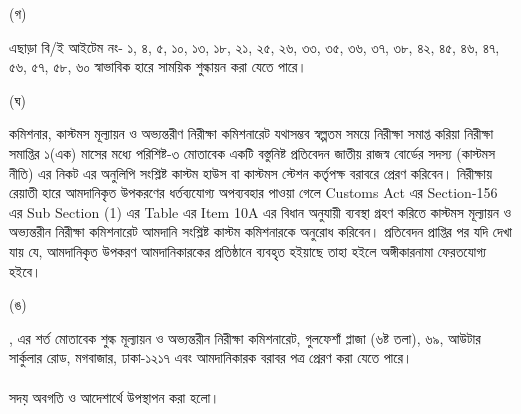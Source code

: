 \documentclass[12pt]{article}
\begin{document}
\begin{minipage}[t]{0.05\linewidth}
\hspace{1em}
\end{minipage}
\begin{minipage}[t]{0.05\linewidth}
(গ)
\end{minipage}
\begin{minipage}[t]{0.90\linewidth}
এছাড়া বি/ই আইটেম নং-
১, ৪, ৫, ‌১০, ১৩, ১৮,
২১, ২৫, ২৬, ৩৩, ৩৫, ৩৬, ৩৭, ৩৮,
৪২, ৪৫, ৪৬, ৪৭, ৫৬, ৫৭, ৫৮, ৬০
স্বাভাবিক হারে
সাময়িক
শুল্কায়ন করা
যেতে পারে।
\\
\end{minipage}
\begin{minipage}[t]{0.05\linewidth}
\hspace{1em}
\end{minipage}
\begin{minipage}[t]{0.05\linewidth}
(ঘ)
\end{minipage}
\begin{minipage}[t]{0.90\linewidth}
কমিশনার, কাস্টমস মূল্যায়ন ও অভ্যন্তরীণ
নিরীক্ষা কমিশনারেট যথাসম্ভব স্বল্পতম সময়ে
নিরীক্ষা সমাপ্ত করিয়া নিরীক্ষা সমাপ্তির
১(এক) মাসের মধ্যে পরিশিষ্ট-৩ মোতাবেক একটি
বস্তুনিষ্ট প্রতিবেদন জাতীয় রাজস্ব বোর্ডের
সদস্য (কাস্টমস নীতি) এর নিকট এর অনুলিপি সংশ্লিষ্ট
কাস্টম হাউস বা কাস্টমস স্টেশন কর্তৃপক্ষ
বরাবরে প্রেরণ করিবেন।
নিরীক্ষায় রেয়াতী হারে আমদানিকৃত উপকরণের
ধর্তব্যযোগ্য অপব্যবহার পাওয়া গেলে
Customs Act এর Section-156
এর Sub Section (1) এর Table এর Item 10A
এর বিধান অনুযায়ী ব্যবস্থা গ্রহণ করিতে কাস্টমস
মূল্যায়ন ও অভ্যন্তরীন নিরীক্ষা কমিশনারেট আমদানি
সংশ্লিষ্ট কাস্টম কমিশনারকে অনুরোধ করিবেন।
প্রতিবেদন প্রাপ্তির পর যদি দেখা যায় যে, আমদানিকৃত
উপকরণ আমদানিকারকের প্রতিষ্ঠানে ব্যবহৃত হইয়াছে তাহা
হইলে অঙ্গীকারনামা ফেরতযোগ্য হইবে।
\\
\end{minipage}
\begin{minipage}[t]{0.05\linewidth}
\hspace{1em}
\end{minipage}
\begin{minipage}[t]{0.05\linewidth}
(ঙ)
\end{minipage}
\begin{minipage}[t]{0.90\linewidth}
{\srootz}, {\srootzd} এর শর্ত মোতাবেক
শুল্ক মূল্যায়ন ও অভ্যন্তরীন নিরীক্ষা কমিশনারেট,
গুলফেশাঁ প্লাজা (৬ষ্ট তলা), ৬৯, আউটার
সার্কুলার রোড, মগবাজার, ঢাকা-১২১৭ এবং
আমদানিকারক বরাবর পত্র প্রেরণ করা যেতে পারে।
\\
\\
সদয় অবগতি ও আদেশার্থে উপস্থাপন করা
হলো।
\end{minipage}
\end{document}
